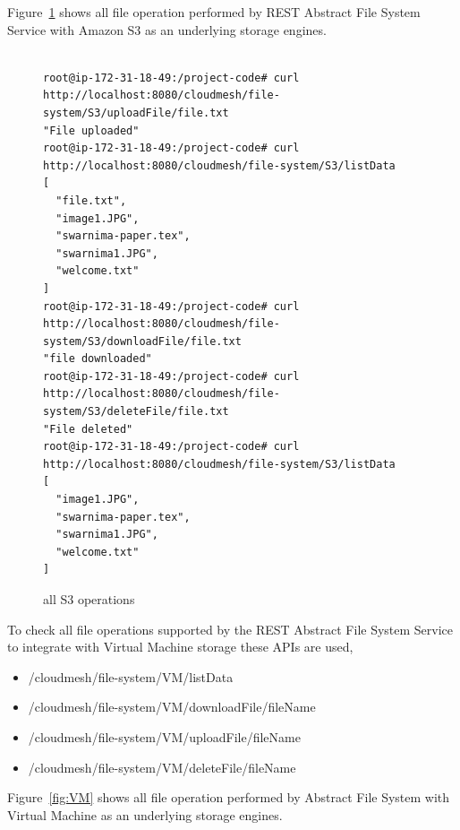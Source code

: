 Figure~\ref{fig:all-s3} shows all file operation performed by REST
Abstract File System Service with Amazon S3 as an underlying storage
engines.

\begin{figure}[!ht]
\begin{footnotesize}
\begin{verbatim}

root@ip-172-31-18-49:/project-code# curl http://localhost:8080/cloudmesh/file-system/S3/uploadFile/file.txt
"File uploaded"
root@ip-172-31-18-49:/project-code# curl http://localhost:8080/cloudmesh/file-system/S3/listData
[
  "file.txt",
  "image1.JPG",
  "swarnima-paper.tex",
  "swarnima1.JPG",
  "welcome.txt"
]
root@ip-172-31-18-49:/project-code# curl http://localhost:8080/cloudmesh/file-system/S3/downloadFile/file.txt
"file downloaded"
root@ip-172-31-18-49:/project-code# curl http://localhost:8080/cloudmesh/file-system/S3/deleteFile/file.txt
"File deleted"
root@ip-172-31-18-49:/project-code# curl http://localhost:8080/cloudmesh/file-system/S3/listData
[
  "image1.JPG",
  "swarnima-paper.tex",
  "swarnima1.JPG",
  "welcome.txt"
]

\end{verbatim}
\end{footnotesize}
\caption{all S3 operations}\label{fig:all-s3}
\end{figure}


To check all file operations supported by the REST Abstract File
System Service to integrate with Virtual Machine storage these APIs
are used,

\begin{itemize}
    \item /cloudmesh/file-system/VM/listData
    \item /cloudmesh/file-system/VM/downloadFile/{fileName}
    \item /cloudmesh/file-system/VM/uploadFile/{fileName}
    \item /cloudmesh/file-system/VM/deleteFile/{fileName}
\end{itemize}

Figure~\ref{fig:VM} shows all file operation performed by Abstract 
File System with Virtual Machine as an underlying storage engines. 

